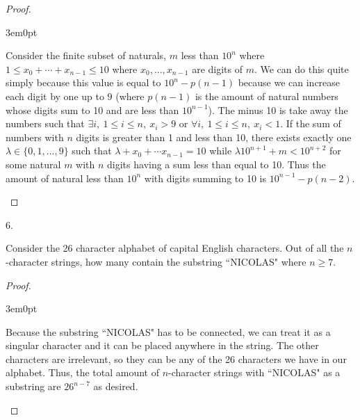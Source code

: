 \documentclass[11pt]{article}
\newenvironment{myproof}
{\begin{proof} \begin{adjustwidth}{3em}{0pt}$ $\par\nobreak\ignorespaces}
{\end{adjustwidth} \end{proof}}
\begin{document}
\begin{flushleft}
\begin{myproof}
Consider the finite subset of naturals, $m$ less than $10^n$ where $1 \leq x_0 + \cdots + x_{n-1} \leq 10$ where $x_0,...,x_{n-1}$ are digits of $m$. We can do this quite simply because this value is equal to $10^n-p(n-1)$ because we can increase each digit by one up to $9$ (where $p(n-1)$ is the amount of natural numbers whose digits sum to 10 and are less than $10^{n-1}$). The minus 10 is take away the numbers such that $\exists i, \  1 \leq i \leq n, \  x_i > 9$ or $\forall i, \ 1 \leq i \leq n, \ x_i < 1$. If the sum of numbers with $n$ digits is greater than 1 and less than 10, there exists exactly one $\lambda \in \{ 0,1,...,9 \}$ such that $\lambda + x_0 + \cdots x_{n-1} = 10$ while $\lambda 10^{n+1} + m < 10^{n+2}$ for some natural $m$ with $n$ digits having a sum less than equal to 10. Thus the amount of natural less than $10^n$ with digits summing to 10 is $10^{n-1}-p(n-2)$.

\end{myproof}

\newpage

6.

Consider the 26 character alphabet of capital English characters. Out of all the $n$-character strings, how many contain the substring ``NICOLAS" where $n \geq 7$.

\begin{myproof}

Because the substring ``NICOLAS" has to be connected, we can treat it as a singular character and it can be placed anywhere in the string. The other characters are irrelevant, so they can be any of the 26 characters we have in our alphabet. Thus, the total amount of $n$-character strings with ``NICOLAS" as a substring are $26^{n-7}$ as desired.

\end{myproof}

\end{flushleft}
\end{document}
